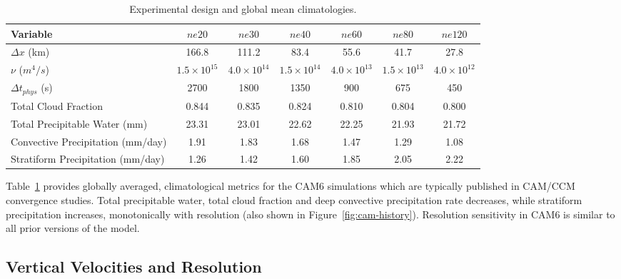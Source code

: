 \documentclass[times]{qjrms4}
\begin{document}
  \begin{table}
 \caption{Experimental design and global mean climatologies.}
 \centering
 \scriptsize
 \begin{tabular}{lcccccc}
   \hline
   Variable & $ne20$ & $ne30$ & $ne40$ & $ne60$ & $ne80$ & $ne120$ \\ 
   \hline
   $\Delta x$ (km) & 166.8 & 111.2 & 83.4 & 55.6 & 41.7 & 27.8 \\
   $\nu$ ($m^4/s$) & $1.5 \times 10^{15}$ & $4.0 \times 10^{14}$ & $1.5 \times 10^{14}$ & $4.0 \times 10^{13}$  & $1.5 \times 10^{13}$ & $4.0 \times 10^{12}$\\
    $\Delta t_{phys}$ (s) & 2700 & 1800 & 1350 & 900 & 675 & 450 \\
   Total Cloud Fraction & 0.844 & 0.835 & 0.824 & 0.810 & 0.804 & 0.800 \\ 
   Total Precipitable Water (mm) & 23.31& 23.01 & 22.62 & 22.25 & 21.93 & 21.72 \\
   Convective Precipitation (mm/day) & 1.91 & 1.83 & 1.68 & 1.47 & 1.29 & 1.08 \\
   Stratiform Precipitation (mm/day) & 1.26 & 1.42 & 1.60 & 1.85 & 2.05 & 2.22 \\      
 \hline
 \end{tabular}
 \label{tbl:table1}
 \end{table}

Table~\ref{tbl:table1} provides globally averaged, climatological metrics for the CAM6 simulations which are typically published in CAM/CCM convergence studies. Total precipitable water, total cloud fraction and deep convective precipitation rate decreases, while stratiform precipitation increases, monotonically with resolution (also shown in Figure~\ref{fig:cam-history}). Resolution sensitivity in CAM6 is similar to all prior versions of the model. 

\subsection{Vertical Velocities and Resolution}
\end{document}
